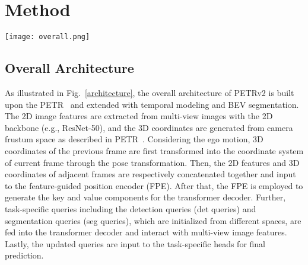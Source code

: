 \documentclass[10pt,twocolumn,letterpaper]{article}
\begin{document}
\section{Method}

\begin{figure*}[t]
	\centering  
	\texttt{[image: overall.png]}
	\caption{The paradigm of the proposed PETRv2. The 2D features are extracted by the backbone network from the multi-view images and the 3D coordinates are generated following the same way as PETR~\cite{liu2022petr}. To achieve the temporal alignment, the 3D coordinates in PETR of previous frame  are firstly transformed through pose transformation. Then 2D image features and 3D coordinates of two frames are concatenated together and injected to feature-guided position encoder to generate the key and value components for the transformer decoder. The detection, segmentation and lane queries, initialized under different spaces, interact with the key and value components in transformer decoder. The updated queries are further used to predict the 3D bounding boxes, BEV segmentation map and the 3D lanes with task-specific heads.  is 3D coordinates alignment from  frame  to  frame .  is concatenation operation along the batch axis.}  
	\label{architecture}
\end{figure*}

\subsection{Overall Architecture}
As illustrated in Fig.~\ref{architecture}, the overall architecture of PETRv2 is built upon the PETR~\cite{liu2022petr} and extended with temporal modeling and BEV segmentation. The 2D image features are extracted from multi-view images with the 2D backbone (e.g., ResNet-50), and the 3D coordinates are generated from camera frustum space as described in PETR~\cite{liu2022petr}. Considering the ego motion, 3D coordinates of the previous frame  are first transformed into the coordinate system of current frame  through the pose transformation. Then, the 2D features and 3D coordinates of adjacent frames are respectively concatenated together and input to the feature-guided position encoder (FPE). After that, the FPE is employed to generate the key and value components for the transformer decoder.
Further, task-specific queries including the detection queries (det queries) and segmentation queries (seg queries), which are initialized from different spaces, are fed into the transformer decoder and interact with multi-view image features. Lastly, the updated queries are input to the task-specific heads for final prediction. 
\end{document}
